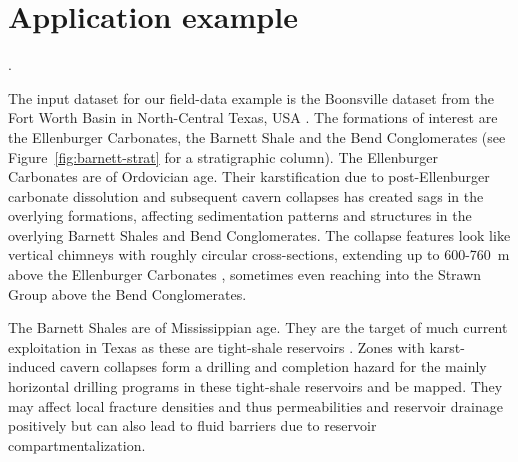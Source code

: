\section{Application example}


.

The input dataset for our field-data example is the Boonsville dataset
from the Fort Worth Basin in North-Central Texas,
USA \cite[]{Hardage1,Hardage2}. The formations of interest are the
Ellenburger Carbonates, the Barnett Shale and the Bend Conglomerates
(see Figure~\ref{fig:barnett-strat} for a stratigraphic column). The
Ellenburger Carbonates are of Ordovician age. Their karstification due
to post-Ellenburger carbonate dissolution and subsequent cavern
collapses has created sags in the overlying formations, affecting
sedimentation patterns and structures in the overlying Barnett Shales
and Bend Conglomerates. The collapse features look like vertical
chimneys with roughly circular cross-sections, extending up to
600-760~m above the Ellenburger Carbonates \cite[]{Hardage1}, sometimes
even reaching into the Strawn Group above the Bend Conglomerates.


The Barnett Shales are of Mississippian age. They are the target of
much current exploitation in Texas as these are tight-shale
reservoirs \cite[]{Pollastro07}. Zones with karst-induced cavern
collapses form a drilling and completion hazard for the mainly
horizontal drilling programs in these tight-shale reservoirs
and   be mapped. They may  affect local
fracture densities and thus permeabilities and reservoir drainage
positively but can also lead to fluid barriers due to reservoir
compartmentalization.

